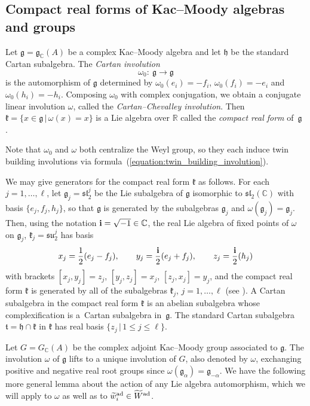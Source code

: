 \documentclass[pdftex]{sigma}
\numberwithin{equation}{section}
\def\C{{\mathbb C}}
\def\R{\mathbb{R}}
\def\a{\alpha}
\def\wtil{\widetilde w}
\def\Wtil{\widetilde W}
\def\bi{{\bf i}}
\def\g{\mathfrak{g}}
\def\fg{\mathfrak{g}}
\def\h{\mathfrak{h}}
\def\k{\mathfrak{k}}
\def\ft{\mathfrak{t}}
\def\fsl{\mathfrak{sl}}
\def\fsu{\mathfrak{su}}
\begin{document}
\subsection{Compact real forms of Kac--Moody algebras and groups}\label{section:Campact_real_forms_of_KM_algebras_and_groups}

Let $\g=\g_{\C}(A)$ be a complex Kac--Moody algebra and let $\h$ be the standard Cartan subalgebra. The {\it Cartan involution}
\[{\omega}_0\colon \ \g\longrightarrow \g\]
is the automorphism of $\g$ determined by ${\omega}_0(e_i)=-f_i$, $\omega_0(f_i)=-e_i$ and ${\omega}_0(h_i)= -h_i$. Composing ${\omega}_0$ with complex conjugation, we obtain a conjugate linear involution $\omega$, called the {\it Cartan--Chevalley involution}. Then $\k=\{x\in\g\,|\, \omega(x)=x\}$ is a Lie algebra over $\R$ called the {\it compact real form} of~$\g$ \cite[p.~243]{Kumar02}.

Note that $\omega_0$ and $\omega$ both centralize the Weyl group, so they each induce twin building involutions via formula~(\ref{equation:twin_building_involution}).

We may give generators for the compact real form $\k$ as follows.
For each $j=1,\dots ,\ell$, let $\g_j = \fsl_2^j$ be the Lie subalgebra of $\g$ isomorphic to $\fsl_2(\C)$ with basis $\{e_j, f_j, h_j\}$, so that
$\g$ is generated by the subalgebras $\g_j$ and $\omega(\g_j)= \g_j$. Then, using the notation $\bi = \sqrt{-1}\in\C$,
the real Lie algebra of fixed points of $\omega$ on $\g_j$, $\k_j=\fsu_2^j$ has basis
\[x_j = \frac{1}{2}(e_j - f_j),\qquad y_j = \frac{\bi}{2}(e_j + f_j), \qquad z_j = \frac{\bi}{2}(h_j)\]
with brackets $[x_j,y_j] = z_j$, $[y_j,z_j] = x_j$, $[z_j,x_j] = y_j$, and the compact real form $\k$ is generated by all of the subalgebras
$\k_j$, $j=1,\dots ,\ell$ (see \cite[Proposition~1]{Berman85}). A Cartan subalgebra in the compact real form $\k$ is an abelian subalgebra whose complexification is a~Cartan subalgebra in~$\g$. The standard Cartan subalgebra $\ft =\h\cap \k$ in $\k$ has real basis $\{z_j\, |\, 1\leq j\leq \ell\}$.

Let $G=G_\C(A)$ be the complex adjoint Kac--Moody group associated to $\g$. The involution $\omega$ of $\g$ lifts to a unique involution of $G$, also denoted by $\omega$, exchanging positive and negative real root groups since $\omega(\fg_\a) = \fg_{-\a}$. We have the following more general lemma about the action of any Lie algebra automorphism, which we will apply to $\omega$ as well as to $\wtil^{\rm ad}_i\in\Wtil^{\rm ad}$.
\end{document}
